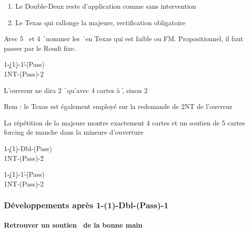 \documentclass[a4paper]{article}
\begin{document}
\begin{enumerate}
\item Le Double-Deux reste d’application comme sans intervention

\item Le Texas qui rallonge la majeure, rectification obligatoire

\end{enumerate}

Avec 5 \s\ et 4 \h\ nommer les \h\ en Texas qui est faible ou FM. 
Propositionnel, il faut passer par le Roudi fixe.

\begin{bidtable}
1\c-(1\d)-1\h-(Pass)\\
1NT-(Pass)-2\d
\end{bidtable}

L’ouvreur ne dira 2 \h\ qu’avec 4 cartes à \h , sinon 2 \s 

Rem : le Texas est également employé sur la redemande de 2NT de l’ouvreur

La répétition de la majeure montre exactement 4 cartes et un soutien 
de 5 cartes forcing de manche dans la mineure d’ouverture

\begin{bidtable}
1\c-(1\d)-Dbl-(Pass)\\
1NT-(Pass)-2\h
\end{bidtable}

\begin{bidtable}
1\c-(1\d)-1\h-(Pass)\\
1NT-(Pass)-2\s
\end{bidtable}

\subsubsection{Développements après 1\pdfc-(1\pdfd)-Dbl-(Pass)-1\pdfh}

\paragraph{Retrouver un soutien \pdfs\ de la bonne main}
\end{document}
